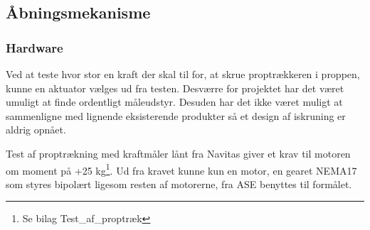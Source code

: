 \subsection{Åbningsmekanisme}
\subsubsection{Hardware}
Ved at teste hvor stor en kraft der skal til for, at skrue proptrækkeren i proppen, kunne en aktuator vælges ud fra testen. Desværre for projektet har det været umuligt at finde ordentligt måleudstyr. Desuden har det ikke været muligt at sammenligne med lignende eksisterende produkter så et design af iskruning er aldrig opnået.

Test af proptrækning med kraftmåler lånt fra Navitas giver et krav til motoren om moment på +25 kg\footnote{Se bilag Test_af_proptræk}. Ud fra kravet kunne kun en motor, en gearet NEMA17 som styres bipolært ligesom resten af motorerne, fra ASE benyttes til formålet. 